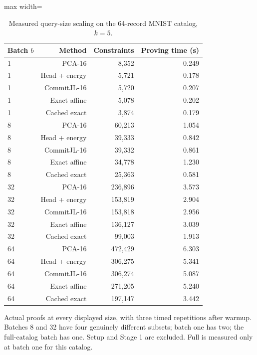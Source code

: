 \begin{table}[tp]
\caption{Measured query-size scaling on the 64-record MNIST catalog, $k=5$.}\label{tab:sensitivity-a}
\centering\small
\begin{adjustbox}{max width=\textwidth}
\begin{tabular}{@{}lrrr@{}}
\toprule
Batch $b$ & Method & Constraints & Proving time (s) \\
\midrule
1 & PCA-16 & 8,352 & 0.249 \\
1 & Head + energy & 5,721 & 0.178 \\
1 & CommitJL-16 & 5,720 & 0.207 \\
1 & Exact affine & 5,078 & 0.202 \\
1 & Cached exact & 3,874 & 0.179 \\
8 & PCA-16 & 60,213 & 1.054 \\
8 & Head + energy & 39,333 & 0.842 \\
8 & CommitJL-16 & 39,332 & 0.861 \\
8 & Exact affine & 34,778 & 1.230 \\
8 & Cached exact & 25,363 & 0.581 \\
32 & PCA-16 & 236,896 & 3.573 \\
32 & Head + energy & 153,819 & 2.904 \\
32 & CommitJL-16 & 153,818 & 2.956 \\
32 & Exact affine & 136,127 & 3.039 \\
32 & Cached exact & 99,003 & 1.913 \\
64 & PCA-16 & 472,429 & 6.303 \\
64 & Head + energy & 306,275 & 5.341 \\
64 & CommitJL-16 & 306,274 & 5.087 \\
64 & Exact affine & 271,205 & 5.240 \\
64 & Cached exact & 197,147 & 3.442 \\
\bottomrule
\end{tabular}
\end{adjustbox}
\par\vspace{3pt}\begin{minipage}{0.98\textwidth}\footnotesize Actual proofs at every displayed size, with three timed repetitions after warmup. Batches 8 and 32 have four genuinely different subsets; batch one has two; the full-catalog batch has one. Setup and Stage 1 are excluded. Full is measured only at batch one for this catalog.\end{minipage}
\end{table}
